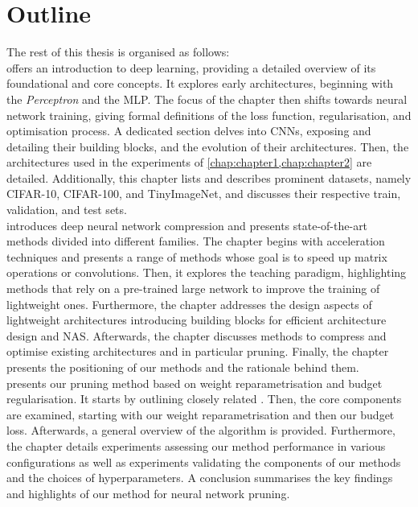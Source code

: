 \section{Outline}

The rest of this thesis is organised as follows:\\

 offers an introduction to deep learning, providing a detailed
overview of its foundational and core concepts. It explores early architectures,
beginning with the \emph{Perceptron} and the \ac{MLP}. The focus of the chapter
then shifts towards neural network training, giving formal definitions of the
loss function, regularisation, and optimisation process. A dedicated section
delves into \aclp{CNN}, exposing and detailing their building blocks, and the
evolution of their architectures. Then, the architectures used in the
experiments of \cref{chap:chapter1,chap:chapter2} are detailed. Additionally,
this chapter lists and describes prominent datasets, namely CIFAR-10, CIFAR-100,
and TinyImageNet, and discusses their respective train, validation, and test
sets.\\

 introduces deep neural network compression and presents
state-of-the-art methods divided into different families. The chapter begins
with acceleration techniques and presents a range of methods whose goal is to
speed up matrix operations or convolutions. Then, it explores the teaching
paradigm, highlighting methods that rely on a pre-trained large network to
improve the training of lightweight ones. Furthermore, the chapter addresses the
design aspects of lightweight architectures introducing building blocks for
efficient architecture design and \acl{NAS}. Afterwards, the chapter discusses
methods to compress and optimise existing architectures and in particular
pruning. Finally, the chapter presents the positioning of our methods and the
rationale behind them.\\

 presents our pruning method based on weight
reparametrisation and budget regularisation. It starts by outlining closely
related \DIFdelbegin {}\DIFdelend \DIFaddbegin {}\DIFaddend . Then, the core \DIFdelbegin {}\DIFdelend \DIFaddbegin {}\DIFaddend components are examined, starting with our
weight reparametrisation and then our budget loss. Afterwards, a general
overview of the algorithm is provided. Furthermore, the chapter details
experiments assessing our method performance in various configurations as well
as experiments validating the components of our methods and the choices of
hyperparameters. A conclusion summarises the key findings and highlights of our
method for neural network pruning.\\

